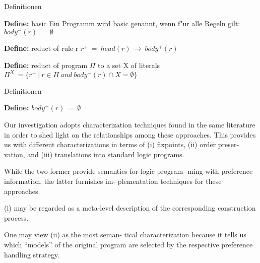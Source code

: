 \begin{frame}{Definitionen}
  \begin{block}{\textbf{Define:} basic}
    Ein Programm wird basic genannt, wenn f"ur alle Regeln gilt:\\
    $body^-(r)~=~\emptyset$
  \end{block}
  \begin{block}{\textbf{Define:} reduct of rule r}
    $r^+~=~head(r)~\rightarrow~body^+(r)$
  \end{block}
  \begin{block}{\textbf{Define:} reduct of program $\Pi$ to a set X of literals}
    $\Pi^X~=\{r^+~|~r \in \Pi~and~body^-(r) \cap X = \emptyset \}$
  \end{block}
\end{frame}


\begin{frame}{Definitionen}
  \begin{block}{\textbf{Define:} }
    $body^-(r)~=~\emptyset$
  \end{block}
\end{frame}






Our investigation adopts characterization techniques found in
the same literature in order to shed light on the relationships
among these approaches. This provides us with different
characterizations in terms of (i) fixpoints, (ii) order preser-
vation, and (iii) translations into standard logic programs.

While the two former provide semantics for logic program-
ming with preference information, the latter furnishes im-
plementation techniques for these approaches.

(i) may
be regarded as a meta-level description of the corresponding
construction process.

One may view (ii) as the most seman-
tical characterization because it tells us which “models” of
the original program are selected by the respective preference
handling strategy.


